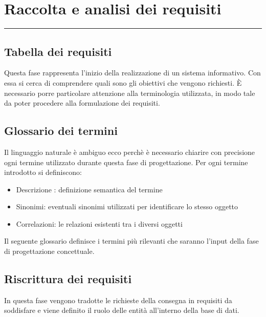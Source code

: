 \documentclass[legalpaper]{article}
\begin{document}
\newpage
\section{Raccolta e analisi dei requisiti}
\rule{\linewidth}{1.5pt}
\subsection{Tabella dei requisiti}
Questa fase rappresenta l’inizio della realizzazione di un sistema informativo. Con essa si cerca di comprendere quali sono gli obiettivi che vengono richiesti. 
È necessario porre particolare attenzione alla terminologia utilizzata, in modo tale da poter procedere alla formulazione dei requisiti.

\subsection{Glossario dei termini}
Il linguaggio naturale è ambiguo ecco perchè è necessario chiarire con precisione ogni termine utilizzato durante questa fase di progettazione.
Per ogni termine introdotto si definiscono:
\begin{itemize}
    \item Descrizione : definizione semantica del termine
    \item Sinonimi: eventuali sinonimi utilizzati per identificare lo stesso oggetto
    \item Correlazioni: le relazioni esistenti tra i diversi oggetti
\end{itemize}
\medskip
Il seguente glossario definisce i termini più rilevanti che saranno l’input della fase di progettazione concettuale.




\subsection{Riscrittura dei requisiti}
In questa fase vengono tradotte le richieste della consegna in requisiti da soddisfare e viene definito il ruolo delle entità all’interno della base di dati.
\end{document}
